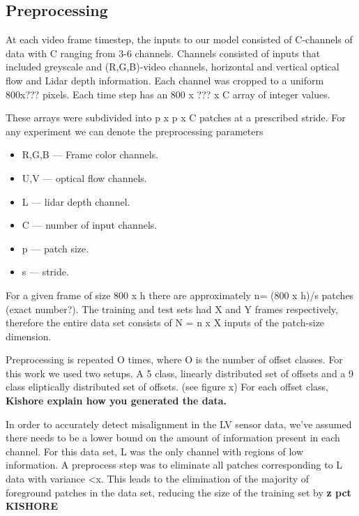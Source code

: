 \documentclass{article}
\begin{document}

\subsection{Preprocessing} %
\label{sub:preprocessing}
At each video frame timestep, the inputs to our model consisted of C-channels of data with C ranging from 3-6 channels. Channels consisted of inputs that included greyscale and (R,G,B)-video channels, horizontal and vertical optical flow and Lidar depth information. Each channel was cropped to a uniform 800x??? pixels. Each time step has an 800 x ??? x C array of integer values.

These arrays were subdivided into p x p x C patches at a prescribed stride. For any experiment we can denote the preprocessing parameters 
\begin{itemize}
\item R,G,B --- Frame color channels.
\item U,V --- optical flow channels.
\item L --- lidar depth channel.
\item C --- number of input channels.
\item p --- patch size.
\item s --- stride.
\end{itemize}  

For a given frame of size 800 x h there are approximately n= (800 x h)/s patches (exact number?). The training and test sets had X and Y frames respectively, therefore the entire data set consists of  N = n x X inputs of the patch-size dimension. 

Preprocessing is repeated O times, where O is the number of offset classes. For this work we used two setups. A 5 class, linearly distributed set of offsets and a 9 class eliptically distributed set of offsets. (see figure x) For each offset class, \textbf{Kishore explain how you generated the data.} 

In order to accurately detect misalignment in the LV sensor data, we've assumed there needs to be a lower bound on the amount of information present in each channel. For this data set, L was the only channel with regions of low information. A preprocess step was to eliminate all patches corresponding to L data with variance <x. This leads to the elimination of the majority of foreground patches in the data set, reducing the size of the training set by \textbf{z pct KISHORE}
\end{document}
